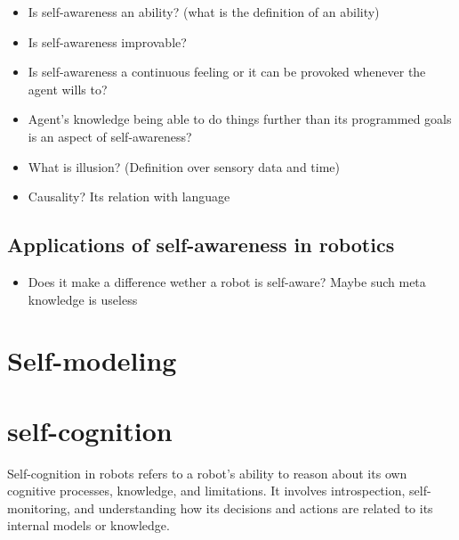     \begin{itemize}
        \item Is self-awareness an ability? (what is the definition of an ability)
        \item Is self-awareness improvable?
        \item Is self-awareness a continuous feeling or it can be provoked whenever the agent wills to?
        \item Agent's knowledge being able to do things further than its programmed goals is an aspect of self-awareness?
        \item What is illusion? (Definition over sensory data and time)
        \item Causality? Its relation with language
    \end{itemize}
    
\subsection{Applications of self-awareness in robotics}
\begin{itemize}
    \item Does it make a difference wether a robot is self-aware? Maybe such meta knowledge is useless
\end{itemize}

\section{Self-modeling}
\section{self-cognition} 
Self-cognition in robots refers to a robot's ability to reason about its own cognitive processes, knowledge, and limitations. It involves introspection, self-monitoring, and understanding how its decisions and actions are related to its internal models or knowledge.

